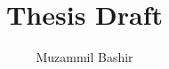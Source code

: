 \documentclass{article}
\title{Thesis Draft}
\author{Muzammil Bashir }
\begin{document}


\doublespacing




\tableofcontents
\newpage
\listoffigures
\newpage
\listoftables
\newpage
\lstlistoflistings
\newpage










\newpage
\singlespacing

 
\end{document}
